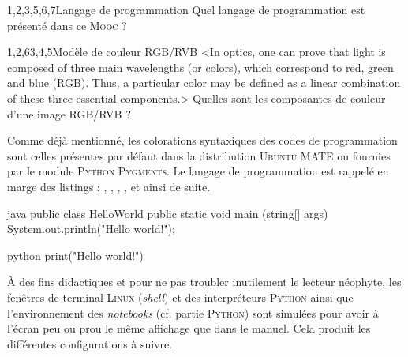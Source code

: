\begin{quiz*}[title=Autoévaluation, points={1,5 points}]
	\begin{mcqdemo*}{4}{1,2,3,5,6,7}{Langage de programmation}
		Quel langage de programmation est présenté dans ce \textsc{Mooc} ?
	\end{mcqdemo*}
	\begin{mcqdemo}{1,2,6}{3,4,5}{Modèle de couleur RGB/RVB}%
	<In optics, one can prove that light is composed of three main wavelengths (or colors), which correspond to red, green and blue (RGB). Thus, a particular color may be defined as a linear combination of these three essential components.>
		Quelles sont les composantes de couleur d'une image RGB/RVB ?
	\end{mcqdemo}
\end{quiz*}

Comme déjà mentionné, les colorations syntaxiques des codes de programmation sont celles présentes par défaut dans la distribution \textsc{Ubuntu} MATE ou fournies par le module \textsc{Python} \textsc{Pygments}. Le langage de programmation est rappelé en marge des listings : \textcolor{firstcolor}{\xfaC}, \textcolor{firstcolor}{\xfaCplusplus}, \textcolor{firstcolor}{\xfaJavaBold}, \textcolor{firstcolor}{\faJs}, \textcolor{firstcolor}{\xfaPython} et ainsi de suite.

\begin{fullwidth}
\hfill
\begin{codebox}[width=0.45\linewidth, nobeforeafter]{java}
public class HelloWorld
{
	public static void main (string[] args)
	{
		System.out.println("Hello world!");
	}
}
\end{codebox}
\qquad\quad %
\begin{codebox}[width=0.265\linewidth, nobeforeafter]{python}
print("Hello world!")
\end{codebox}
\end{fullwidth}

À des fins didactiques et pour ne pas troubler inutilement le lecteur néophyte, les fenêtres de terminal \textsc{Linux} (\textit{shell}) et des interpréteurs \textsc{Python} ainsi que l'environnement des \textit{notebooks} (cf. partie \textsc{Python}) sont simulées pour avoir à l'écran peu ou prou le même affichage que dans le manuel. Cela produit les différentes configurations à suivre.

